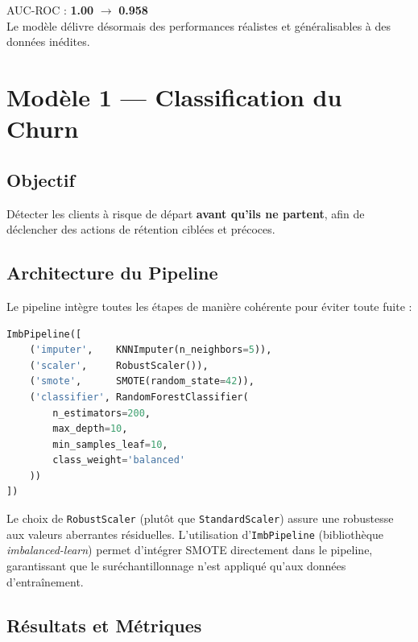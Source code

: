 \documentclass[12pt,a4paper]{article}
\begin{document}
\begin{successbox}
AUC-ROC : \textbf{1.00} $\rightarrow$ \textbf{0.958} \\
Le modèle délivre désormais des performances réalistes et généralisables à des données inédites.
\end{successbox}

\section{Modèle 1 — Classification du Churn}

\subsection{Objectif}

Détecter les clients à risque de départ \textbf{avant qu'ils ne partent}, afin de déclencher
des actions de rétention ciblées et précoces.

\subsection{Architecture du Pipeline}

Le pipeline intègre toutes les étapes de manière cohérente pour éviter toute fuite :

\begin{lstlisting}[language=Python, caption=Pipeline de classification (scikit-learn)]
ImbPipeline([
    ('imputer',    KNNImputer(n_neighbors=5)),
    ('scaler',     RobustScaler()),
    ('smote',      SMOTE(random_state=42)),
    ('classifier', RandomForestClassifier(
        n_estimators=200,
        max_depth=10,
        min_samples_leaf=10,
        class_weight='balanced'
    ))
])
\end{lstlisting}

Le choix de \texttt{RobustScaler} (plutôt que \texttt{StandardScaler}) assure une robustesse
aux valeurs aberrantes résiduelles. L'utilisation d'\texttt{ImbPipeline} (bibliothèque
\textit{imbalanced-learn}) permet d'intégrer SMOTE directement dans le pipeline,
garantissant que le suréchantillonnage n'est appliqué qu'aux données d'entraînement.

\subsection{Résultats et Métriques}
\end{document}
